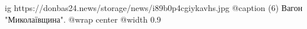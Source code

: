  
 
 
 
 

\ifcmt
  ig https://donbas24.news/storage/news/i89b0p4cgiykavhs.jpg
	@caption (6) Вагон "Миколаївщина".
  @wrap center
  @width 0.9
\fi

